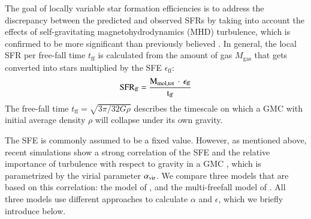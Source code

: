 \documentclass{aa}
\begin{document}
The goal of locally variable star formation efficiencies is to address the discrepancy between the predicted and observed SFRs by taking into account the effects of self-gravitating magnetohydrodynamics (MHD) turbulence, which is confirmed to be more significant than previously believed \citep{Sun_2020, Evans_2021}. 
In general, the local SFR per free-fall time $t_{\mathrm{ff}}$ is calculated from the amount of gas $M_{\mathrm{gas}}$ that gets converted into stars multiplied by the SFE $\epsilon_{\mathrm{ff}}$:
\begin{align}
\label{eq:SFR}
    \rm{SFR}_{\mathrm{ff}} = \frac{M_{\mathrm{mol, tot}} \, \cdot \, \epsilon_{\mathrm{ff}}}{t_{\mathrm{ff}}}
\end{align}
The free-fall time $t_{\mathrm{ff}} = \sqrt{3 \pi/32 G \rho}$
describes the timescale on which a GMC with initial average density $\rho$ will collapse under its own gravity.

The SFE is commonly assumed to be a fixed value. However, as mentioned above, recent simulations show a strong correlation of the SFE and the relative importance of turbulence with respect to gravity in a GMC \citep[e.g.][]{Padoan_2012, Kim_2021}, which is parametrized by the virial parameter $\alpha_{\rm vir}$. We compare three models that are based on this correlation: the model of \cite{Padoan_2012}, \cite{Hopkins_2013} and the multi-freefall model of \cite{Federrath_2014}. All three models use different approaches to calculate $\alpha$ and $\epsilon$, which we briefly introduce below.
\end{document}
